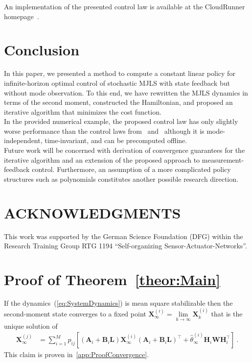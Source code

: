 \documentclass[preprint,1p,11pt]{IR-Template/ISAS_IR}
\newcommand{\mat}[1]{{\ensuremath{{\mathbf{#1}}}}}
\newcommand{\tr}{^{\top}}
\newcommand{\bklammer}[1]{\left[ #1 \right]}
\newcommand{\Asys}[1]{\mat{A}_{#1}}
\newcommand{\Bsys}[1]{\mat{B}_{#1}}
\newcommand{\Hsys}[1]{\mat{H}_{#1}}
\newcommand{\wCov}{\mat{W}}
\newcommand{\modeest}[2]{\widehat{\theta}^{(#1)}_{#2}}
\newcommand{\transitionprob}[1]{p_{#1}}
\newcommand{\Xsysest}[2]{\mat{X}^{(#1)}_{#2}}
\newcommand{\ControlLaw}{\mat{L}}
\newcommand{\NumModes}{M}
\begin{document}
An implementation of the presented control law is available at the CloudRunner homepage~\cite{Cloudrunner}.    	
   \section{Conclusion}
   	\label{sec:Conclusion}
   	In this paper, we presented a method to compute a constant linear policy for infinite-horizon optimal control of stochastic MJLS with state feedback but without mode observation. To this end, we have rewritten the MJLS dynamics in terms of the second moment, constructed the Hamiltonian, and proposed an iterative algorithm that minimizes the cost function.\\

In the provided numerical example, the proposed control law has only slightly worse performance than the control laws from~\cite{Vargas_2013} and~\cite{Chizeck_1986} although it is mode-independent, time-invariant, and can be precomputed offline.\\

Future work will be concerned with derivation of convergence guarantees for the iterative algorithm and an extension of the proposed approach to measurement-feedback control. Furthermore, an assumption of a more complicated policy structures such as polynomials constitutes another possible research direction.    	
   \section{ACKNOWLEDGMENTS}
This work was supported by the German Science Foundation
   (DFG) within the Research Training Group RTG 1194 ``Self-organizing Sensor-Actuator-Networks''.
   	
   \appendix
   \section{Proof of Theorem~\ref{theor:Main}}
   	\label{app:ProofMainTheorem}
   	If the dynamics~(\ref{eq:SystemDynamics}) is mean square stabilizable then the second-moment state converges to a fixed point $\Xsysest{i}{\infty} = \lim\limits_{k\rightarrow\infty} \Xsysest{i}{k}$ that is the unique solution of
\begin{align*}
\Xsysest{j}{\infty}
	&=
	\sum\limits_{i=1}^{\NumModes}\transitionprob{ij}\bklammer{(\Asys{i}+\Bsys{i}\ControlLaw)\Xsysest{i}{\infty}(\Asys{i}+\Bsys{i}\ControlLaw)\tr + \modeest{i}{\infty}\Hsys{i}\wCov\Hsys{i}\tr}\ .
\end{align*}
This claim is proven in~\ref{app:ProofConvergence}.\\
\end{document}
